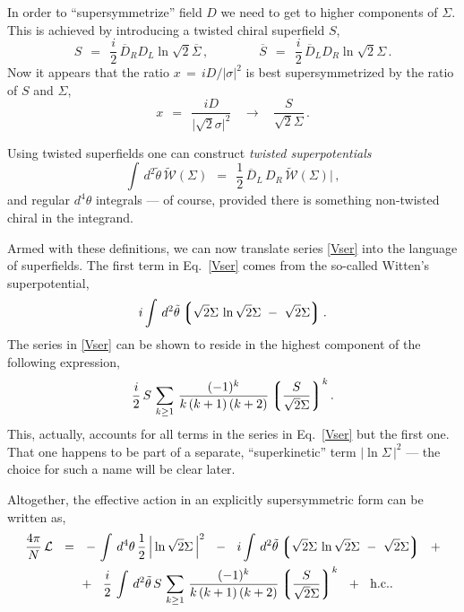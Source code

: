 \documentclass[epsfig,12pt]{article}
\def\beq{\begin{equation}}
\def\eeq{\end{equation}}
\newcommand{\cell}{{\mathcal L}}
\newcommand{\cw}{{\mathcal W}}
\newcommand{\wt}{\widetilde}
\newcommand{\ov}{\overline}
\newcommand{\lgr}{\left\lgroup}
\newcommand{\rgr}{\right\rgroup}
\begin{document}
	In order to ``supersymmetrize'' field $ D $ we need to get to higher components of $ \Sigma $.
	This is achieved by introducing a twisted chiral superfield $ S $,
\beq
	S    ~~=~~    \frac{i}{2}\,\ov D{}_R D_L \ln \sqrt{2}\ov\Sigma\,,
	\qquad\qquad
	\ov S    ~~=~~    \frac{i}{2}\, \ov D{}_L D_R \ln \sqrt{2}\Sigma\,.
\eeq
	Now it appears that the ratio $ x \,=\, iD/|\sigma|^2 $ is best supersymmetrized \cite{1p} by
	the ratio of $ S $ and $ \Sigma $,
\beq
	x    ~~=~~    \frac{iD}{\big|\sqrt{2}\sigma\big|^2}    ~~~~\longrightarrow~~~~
		\frac{S}{\sqrt{2}\Sigma}\,.
\eeq

	Using twisted superfields one can construct {\it twisted superpotentials}
\beq
	\int\, d^2\tilde\theta\, \wt{\cw}(\Sigma)    ~~=~~    \frac{1}{2}\,\ov D{}_L\, D_R\, \wt{\cw}(\Sigma)\Big|\,,
\eeq
	and regular $ d^4\theta $ integrals --- of course, provided there is something non-twisted chiral
	in the integrand.

	Armed with these definitions, we can now translate series \eqref{Vser} into
	the language of superfields.
	The first term in Eq.~\eqref{Vser} comes from the so-called Witten's superpotential,
\beq
	i \int\, d^2\tilde\theta 
	\lgr
		\sqrt{2}\Sigma\, \ln \sqrt{2}\Sigma  ~-~ \sqrt{2}\Sigma
	\rgr.
\eeq
	The series in \eqref{Vser} can be shown to reside in the highest component of
	the following expression,
\beq
	\frac{i}{2}\, 
	S\,
	\sum_{k \geq 1}\, \frac{    (-1)^k    }
                           {  k\,(k + 1)\,(k + 2)  } \lgr \frac{S}{\sqrt{2}\Sigma} \rgr^k.
\eeq
	This, actually, accounts for all terms in the series in Eq.~\eqref{Vser} but the first one.
	That one happens to be part of a separate, ``superkinetic'' term $ |\ln \Sigma\,|^2 $ ---
	the choice for such a name will be clear later.

	Altogether, the effective action in an explicitly supersymmetric form can be written as,
\begin{align}
%
\notag
	\frac{4\pi}{N}\,\cell &    ~~=~~
			-\,
			\int\, d^4\theta\, \frac{1}{2}\, \Big| \ln \sqrt{2}\Sigma \, \Big|^2
			~~-~~
			i \int\, d^2\tilde\theta 
			\lgr
			\sqrt{2}\Sigma\, \ln \sqrt{2}\Sigma  ~-~ \sqrt{2}\Sigma
			\rgr
			~~+
	\\
%
\label{sseries}
	&
			\phantom{~~=~~}
			+~~
			\frac{i}{2}\, 
			\int\, d^2\tilde\theta\,
			S\,
			\sum_{k \geq 1}\, \frac{    (-1)^k    }
                                           {  k\,(k + 1)\,(k + 2)  } \lgr \frac{S}{\sqrt{2}\Sigma} \rgr^k
			~~+~~ \text{h.c.}.
\end{align}
\end{document}
